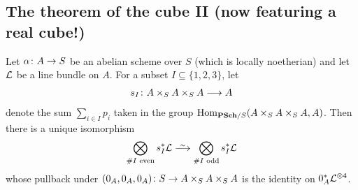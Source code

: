 \documentclass[a4paper,parskip=half,numbers=enddot, DIV=12]{scrreprt}
\begin{document}
\subsection{The theorem of the cube II (now featuring a real cube!)}
\begin{thm}
	Let $\alpha\colon A\morphism S$ be an abelian scheme over $S$ (which is locally noetherian) and let $\mathcal{L}$ be a line bundle on $A$. For a subset $I\subseteq\{1,2,3\}$, let
	\begin{align*}
		s_I\colon A\times_SA\times_SA\morphism A
	\end{align*}
	denote the sum $\sum_{i\in I}p_i$ taken in the group $\Hom_{\cat{PSch}/S}(A\times_SA\times_SA,A)$. Then there is a unique isomorphism
	\begin{align}\lbl{eq:desiredIso}
		\bigotimes_{\#I\text{ even}}s_I^*\Ll\isomorphism \bigotimes_{\#I\text{ odd}}s_I^*\Ll
	\end{align}
	whose pullback under $( 0_A, 0_A, 0_A)\colon S\morphism A\times_SA\times_SA$ is the identity on $ 0_A^*\mathcal{L}^{\otimes 4}$.
\end{thm}
\end{document}
